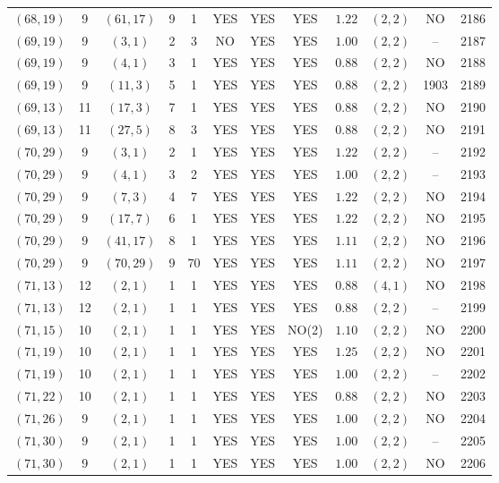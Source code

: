 \begin{longtable}{|c|c|c|c|c|c|c|c|c|c|c|c|}
$(68,19)$ & 9 & $(61,17)$ & 9 & 1 & YES & YES & YES & $1.22$ & $(2,2)$ & NO & 2186\\
$(69,19)$ & 9 & $(3,1)$ & 2 & 3 & NO & YES & YES & $1.00$ & $(2,2)$ & -- & 2187\\
$(69,19)$ & 9 & $(4,1)$ & 3 & 1 & YES & YES & YES & $0.88$ & $(2,2)$ & NO & 2188\\
$(69,19)$ & 9 & $(11,3)$ & 5 & 1 & YES & YES & YES & $0.88$ & $(2,2)$ & 1903 & 2189\\
$(69,13)$ & 11 & $(17,3)$ & 7 & 1 & YES & YES & YES & $0.88$ & $(2,2)$ & NO & 2190\\
$(69,13)$ & 11 & $(27,5)$ & 8 & 3 & YES & YES & YES & $0.88$ & $(2,2)$ & NO & 2191\\
$(70,29)$ & 9 & $(3,1)$ & 2 & 1 & YES & YES & YES & $1.22$ & $(2,2)$ & -- & 2192\\
$(70,29)$ & 9 & $(4,1)$ & 3 & 2 & YES & YES & YES & $1.00$ & $(2,2)$ & -- & 2193\\
$(70,29)$ & 9 & $(7,3)$ & 4 & 7 & YES & YES & YES & $1.22$ & $(2,2)$ & NO & 2194\\
$(70,29)$ & 9 & $(17,7)$ & 6 & 1 & YES & YES & YES & $1.22$ & $(2,2)$ & NO & 2195\\
$(70,29)$ & 9 & $(41,17)$ & 8 & 1 & YES & YES & YES & $1.11$ & $(2,2)$ & NO & 2196\\
$(70,29)$ & 9 & $(70,29)$ & 9 & 70 & YES & YES & YES & $1.11$ & $(2,2)$ & NO & 2197\\
$(71,13)$ & 12 & $(2,1)$ & 1 & 1 & YES & YES & YES & $0.88$ & $(4,1)$ & NO & 2198\\
$(71,13)$ & 12 & $(2,1)$ & 1 & 1 & YES & YES & YES & $0.88$ & $(2,2)$ & -- & 2199\\
$(71,15)$ & 10 & $(2,1)$ & 1 & 1 & YES & YES & NO(2) & $1.10$ & $(2,2)$ & NO & 2200\\
$(71,19)$ & 10 & $(2,1)$ & 1 & 1 & YES & YES & YES & $1.25$ & $(2,2)$ & NO & 2201\\
$(71,19)$ & 10 & $(2,1)$ & 1 & 1 & YES & YES & YES & $1.00$ & $(2,2)$ & -- & 2202\\
$(71,22)$ & 10 & $(2,1)$ & 1 & 1 & YES & YES & YES & $0.88$ & $(2,2)$ & NO & 2203\\
$(71,26)$ & 9 & $(2,1)$ & 1 & 1 & YES & YES & YES & $1.00$ & $(2,2)$ & NO & 2204\\
$(71,30)$ & 9 & $(2,1)$ & 1 & 1 & YES & YES & YES & $1.00$ & $(2,2)$ & -- & 2205\\
$(71,30)$ & 9 & $(2,1)$ & 1 & 1 & YES & YES & YES & $1.00$ & $(2,2)$ & NO & 2206\\

\end{longtable}
